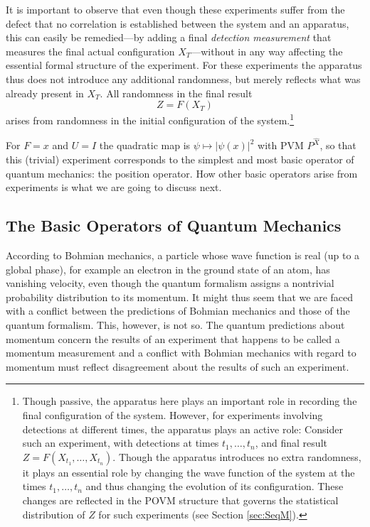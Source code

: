 \documentclass[12pt]{article}
\newcommand{\BM}{Bohmian mechanics}
\newcommand{\qf}{quantum formalism}
\newcommand{\wf}{wave function}
\newcommand{\id}{I}
\begin{document}
It is important to observe that even though these experiments suffer
{}from the defect that no correlation is established between the
system and an apparatus, this can easily be remedied---by adding a
final {\it detection measurement} that measures the final actual
configuration ${X}_T$---without in any way affecting the essential
formal structure of the experiment. For these experiments the
apparatus thus does not introduce any additional randomness, but
merely reflects what was already present in ${X}_T$.  All randomness
in the final result
\begin{equation}
Z=F(X_{T})
\label{eq:finresnoy}
\end{equation}
arises {}from randomness in the initial configuration of the
system.\footnote{Though passive, the apparatus here plays an important
   role in recording the final configuration of the system.  However,
   for experiments involving detections at different times, the
   apparatus plays an active role: Consider such an experiment, with
   detections at times $t_1,\ldots,t_n$, and final result $ Z =
   F(X_{t_1}, \ldots, X_{t_n})$.  Though the apparatus introduces no
   extra randomness, it plays an essential role by changing the wave
   function of the system at the times $t_1,\ldots,t_n$ and thus
   changing the evolution of its configuration. These changes are
   reflected in the POVM structure that governs the statistical
   distribution of $Z$ for such experiments (see Section
   \ref{sec:SeqM}).}

For $F=x$ and $U=\id$ the quadratic map is $\psi \mapsto
|\psi(x)|^{2}$ with PVM $P^{\hat{X}}$, so that this (trivial)
experiment corresponds to the simplest and most basic operator of
quantum mechanics: the position operator.  How other basic operators
arise {}from experiments is what we are going to discuss next.

\subsection{The Basic Operators of Quantum  Mechanics}
\label{subsec.basop}

According to \BM{}, a particle whose \wf{} is real (up to a global
phase), for example an electron in the ground state of an atom, has
vanishing velocity, even though the \qf{} assigns a nontrivial
probability distribution to its momentum.  It might thus seem that we
are faced with a conflict between the predictions of \BM{} and those
of the quantum formalism. This, however, is not so. The quantum
predictions about momentum concern the results of an experiment that
happens to be called a momentum measurement and a conflict with \BM{}
with regard to momentum must reflect disagreement about the results of
such an experiment.
\end{document}
